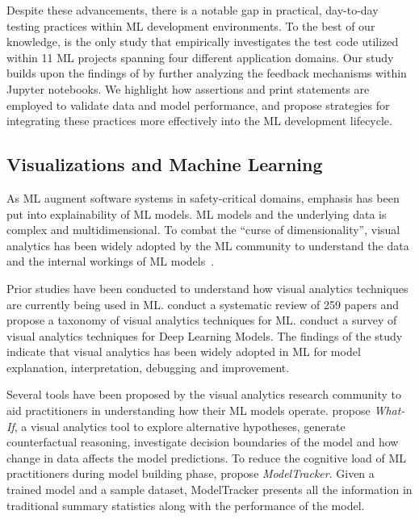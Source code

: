 \documentclass[smallextended]{svjour3}       %
\begin{document}
Despite these advancements, there is a notable gap in practical, day-to-day testing practices within ML development environments. To the best of our knowledge, \citet{openja_empirical_2024} is the only study that empirically investigates the test code utilized within 11 ML projects spanning four different application domains. Our study builds upon the findings of \citet{openja_empirical_2024} by further analyzing the feedback mechanisms within Jupyter notebooks. We highlight how assertions and print statements are employed to validate data and model performance, and propose strategies for integrating these practices more effectively into the ML development lifecycle.

\subsection{Visualizations and Machine Learning}\label{sec:visualizations}

As ML augment software systems in safety-critical domains, emphasis has been put into explainability of ML models. ML models and the underlying data is complex and multidimensional. To combat the ``curse of dimensionality'', visual analytics has been widely adopted by the ML community to understand the data and the internal workings of ML models~\citep{yuan2021survey,hohman2019visual,wexler2019what-if}.

Prior studies have been conducted to understand how visual analytics techniques are currently being used in ML. \citet{yuan2021survey} conduct a systematic review of 259 papers and propose a taxonomy of visual analytics techniques for ML. \citet{hohman2019visual} conduct a survey of visual analytics techniques for Deep Learning Models. The findings of the study indicate that visual analytics has been widely adopted in ML for model explanation, interpretation, debugging and improvement.

Several tools have been proposed by the visual analytics research community to aid practitioners in understanding how their ML models operate. \citet{wexler2019what-if} propose \textit{What-If}, a visual analytics tool to explore alternative hypotheses, generate counterfactual reasoning, investigate decision boundaries of the model and how change in data affects the model predictions. To reduce the cognitive load of ML practitioners during model building phase, \citet{amershi2019software} propose \textit{ModelTracker}. Given a trained model and a sample dataset, ModelTracker presents all the information in traditional summary statistics along with the performance of the model.
\end{document}
